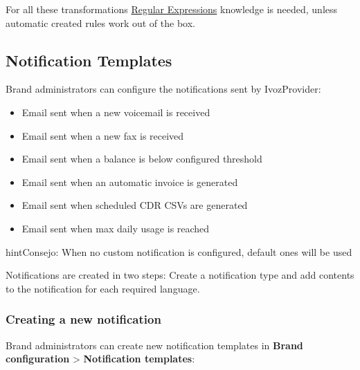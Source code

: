 \documentclass[letterpaper,10pt,spanish]{sphinxmanual}
\begin{document}
For all these transformations \href{http://php.net/manual/en/reference.pcre.pattern.syntax.php}{Regular Expressions} knowledge
is needed, unless automatic created rules work out of the box.
\label{administration_portal/brand/settings/notification_templates:notification-templates}

\subsection{Notification Templates}
\label{administration_portal/brand/settings/notification_templates:id2}\label{administration_portal/brand/settings/notification_templates::doc}\label{administration_portal/brand/settings/notification_templates:notification-templates}\label{administration_portal/brand/settings/notification_templates:id1}
Brand administrators can configure the notifications sent by IvozProvider:
\begin{itemize}
\item {} 
Email sent when a new voicemail is received

\item {} 
Email sent when a new fax is received

\item {} 
Email sent when a balance is below configured threshold

\item {} 
Email sent when an automatic invoice is generated

\item {} 
Email sent when scheduled CDR CSVs are generated

\item {} 
Email sent when max daily usage is reached

\end{itemize}

\begin{notice}{hint}{Consejo:}
When no custom notification is configured, default ones will be used
\end{notice}

Notifications are created in two steps: Create a notification type and add contents to the notification for each
required language.


\subsubsection{Creating a new notification}
\label{administration_portal/brand/settings/notification_templates:creating-a-new-notification}
Brand administrators can create new notification templates in \textbf{Brand configuration} \textgreater{} \textbf{Notification templates}:
\end{document}

